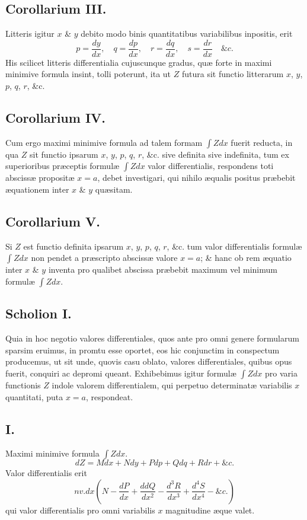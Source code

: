 \subsection*{Corollarium III.}
Litteris igitur $x$ \& $y$ debito modo binis quantitatibus variabilibus inpositis, erit
\[p=\frac{dy}{dx},\quad q=\frac{dp}{dx},\quad r=\frac{dq}{dx},\quad s=\frac{dr}{dx}\quad\&c.\]
His scilicet litteris differentialia cujuscunque gradus, quæ forte in maximi minimive formula insint, tolli poterunt, ita ut $Z$ futura sit functio litterarum $x$, $y$, $p$, $q$, $r$, \&c.
\subsection*{Corollarium IV.}
Cum ergo maximi minimive formula ad talem formam $\int Zdx$ fuerit reducta, in qua $Z$ sit functio ipsarum $x$, $y$, $p$, $q$, $r$, \&c. sive definita sive indefinita, tum ex superioribus præceptis formulæ $\int Zdx$ valor differentialis, respondens toti abscissæ propositæ $x=a$, debet investigari, qui nihilo æqualis positus præbebit æquationem inter $x$ \& $y$ quæsitam.
\subsection*{Corollarium V.}
Si $Z$ est functio definita ipsarum $x$, $y$, $p$, $q$, $r$, \&c. tum valor differentialis formulæ $\int Zdx$ non pendet a præscripto abscissæ valore $x=a$; \& hanc ob rem æquatio inter $x$ \& $y$ inventa pro qualibet abscissa præbebit maximum vel minimum formulæ $\int Zdx$.
\subsection*{Scholion I.}
Quia in hoc negotio valores differentiales, quos ante pro omni genere formularum sparsim eruimus, in promtu esse oportet, eos hic conjunctim in conspectum producemus, ut sit unde, quovis casu oblato, valores differentiales, quibus opus fuerit, conquiri ac depromi queant. Exhibebimus igitur formulæ $\int Zdx$ pro varia functionis $Z$ indole valorem differentialem, qui perpetuo determinatæ variabilis $x$ quantitati, puta $x=a$, respondeat.
\subsection*{I.}
Maximi minimive formula $\int Zdx$.
\[dZ=Mdx+Ndy+Pdp+Qdq+Rdr+\&c.\]
Valor differentialis erit
\[nv.dx\left(N-\frac{dP}{dx}+\frac{ddQ}{dx^2}-\frac{d^3R}{dx^3}+\frac{d^4S}{dx^4}-\&c.\right)\]
qui valor differentialis pro omni variabilis $x$ magnitudine æque valet.
